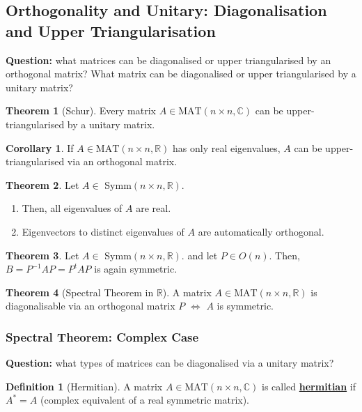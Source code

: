 \documentclass[11pt]{scrartcl}
\newcommand{\R}[0]{\mathbb{R}}
\theoremstyle{definition}
\newtheorem{theorem}{Theorem}
\newtheorem{corollary}{Corollary}
\newtheorem{definition}{Definition}
\theoremstyle{remark}
\newcommand{\dfn}[1]{\textbf{\underline{#1}}}
\newcommand{\matn}[1]{\text{MAT}(n\times n, \mathbb{#1})}
\begin{document}
\subsection{Orthogonality and Unitary: Diagonalisation and Upper Triangularisation }

\textbf{Question:} what matrices can be diagonalised or upper triangularised by an orthogonal matrix? What matrix can be diagonalised or upper triangularised by a unitary matrix?

\begin{theorem}[Schur]
	Every matrix $A \in \matn{C}$ can be upper-triangularised by a unitary matrix. 
\end{theorem}

\begin{corollary}
	If $A \in \matn{R}$ has only real eigenvalues, $A$ can be upper-triangularised via an orthogonal matrix. 
\end{corollary}

\begin{theorem}
	Let $A \in $ Symm$(n \times n, \R)$. 
	\begin{enumerate}[noitemsep]
		\item Then, all eigenvalues of $A$ are real. 
		\item Eigenvectors to distinct eigenvalues of $A$ are automatically orthogonal. 
	\end{enumerate}
\end{theorem}

\begin{theorem}
	Let $A \in $ Symm$(n \times n, \R)$.  and let $P \in O(n)$. Then, $B= P^{-1}AP = P^t A P$ is again symmetric. 
\end{theorem}

\begin{theorem}[Spectral Theorem in $\R$]
	A matrix $A \in \matn{R}$ is diagonalisable via an orthogonal matrix $P$ $\iff$ $A$ is symmetric. 
\end{theorem}

\subsubsection{Spectral Theorem: Complex Case}
\textbf{Question:} what types of matrices can be diagonalised via a unitary matrix? 

\begin{definition}[Hermitian] 
	A matrix $A \in \matn{C}$ is called \dfn{hermitian} if $A^* = A$ (complex equivalent of a real symmetric matrix). 
\end{definition}
\end{document}
